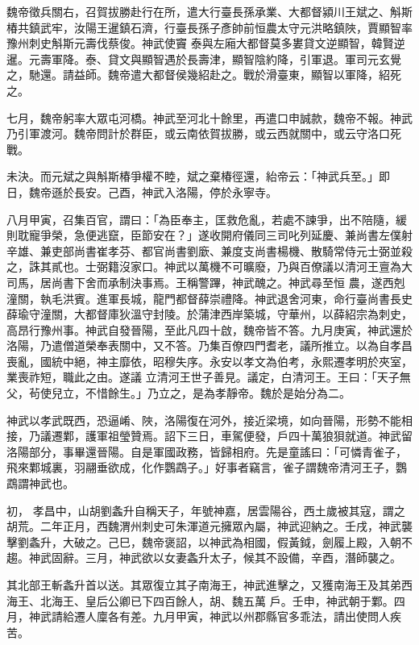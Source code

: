 \begin{pinyinscope}
 魏帝徵兵關右，召賀拔勝赴行在所，遣大行臺長孫承業、大都督潁川王斌之、斛斯椿共鎮武牢，汝陽王暹鎮石濟，行臺長孫子彥帥前恒農太守元洪略鎮陜，賈顯智率豫州刺史斛斯元壽伐蔡俊。神武使竇
 泰與左廂大都督莫多婁貸文逆顯智，韓賢逆暹。元壽軍降。泰、貸文與顯智遇於長壽津，顯智陰約降，引軍退。軍司元玄覺之，馳還。請益師。魏帝遣大都督侯幾紹赴之。戰於滑臺東，顯智以軍降，紹死之。



 七月，魏帝躬率大眾屯河橋。神武至河北十餘里，再遣口申誠款，魏帝不報。神武乃引軍渡河。魏帝問計於群臣，或云南依賀拔勝，或云西就關中，或云守洛口死戰。



 未決。而元斌之與斛斯椿爭權不睦，斌之棄椿徑還，紿帝云：「神武兵至。」即
 日，魏帝遜於長安。己酉，神武入洛陽，停於永寧寺。



 八月甲寅，召集百官，謂曰：「為臣奉主，匡救危亂，若處不諫爭，出不陪隨，緩則耽寵爭榮，急便逃竄，臣節安在？」遂收開府儀同三司叱列延慶、兼尚書左僕射辛雄、兼吏部尚書崔孝芬、都官尚書劉廞、兼度支尚書楊機、散騎常侍元士弼並殺之，誅其貳也。士弼籍沒家口。神武以萬機不可曠廢，乃與百僚議以清河王亶為大司馬，居尚書下舍而承制決事焉。王稱警蹕，神武醜之。神武尋至恒
 農，遂西剋潼關，執毛洪賓。進軍長城，龍門都督薛崇禮降。神武退舍河東，命行臺尚書長史薛瑜守潼關，大都督庫狄溫守封陵。於蒲津西岸築城，守華州，以薛紹宗為刺史，高昂行豫州事。神武自發晉陽，至此凡四十啟，魏帝皆不答。九月庚寅，神武還於洛陽，乃遣僧道榮奉表關中，又不答。乃集百僚四門耆老，議所推立。以為自孝昌喪亂，國統中絕，神主靡依，昭穆失序。永安以孝文為伯考，永熙遷孝明於夾室，業喪祚短，職此之由。遂議
 立清河王世子善見。議定，白清河王。王曰：「天子無父，茍使兒立，不惜餘生。」乃立之，是為孝靜帝。魏於是始分為二。



 神武以孝武既西，恐逼崤、陜，洛陽復在河外，接近梁境，如向晉陽，形勢不能相接，乃議遷鄴，護軍祖瑩贊焉。詔下三日，車駕便發，戶四十萬狼狽就道。神武留洛陽部分，事畢還晉陽。自是軍國政務，皆歸相府。先是童謠曰：「可憐青雀子，飛來鄴城裏，羽翮垂欲成，化作鸚鵡子。」好事者竊言，雀子謂魏帝清河王子，鸚鵡謂神武也。



 初，
 孝昌中，山胡劉螽升自稱天子，年號神嘉，居雲陽谷，西土歲被其寇，謂之胡荒。二年正月，西魏渭州刺史可朱渾道元擁眾內屬，神武迎納之。壬戌，神武襲擊劉螽升，大破之。己巳，魏帝褒詔，以神武為相國，假黃鉞，劍履上殿，入朝不趨。神武固辭。三月，神武欲以女妻螽升太子，候其不設備，辛酉，潛師襲之。



 其北部王斬螽升首以送。其眾復立其子南海王，神武進擊之，又獲南海王及其弟西海王、北海王、皇后公卿已下四百餘人，胡、魏五萬
 戶。壬申，神武朝于鄴。四月，神武請給遷人廩各有差。九月甲寅，神武以州郡縣官多乖法，請出使問人疾苦。




\end{pinyinscope}
